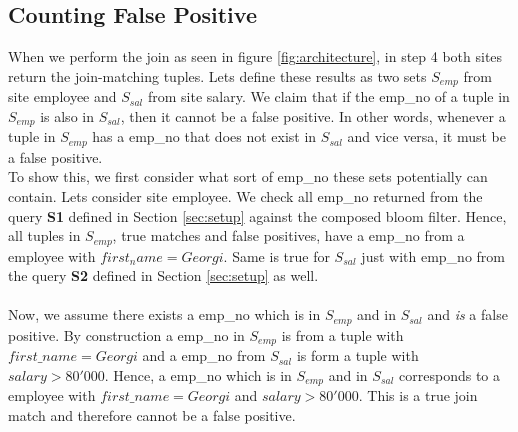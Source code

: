 \documentclass[12]{scrartcl}
\begin{document}
\subsection{Counting False Positive} \label{sec:falsepositives}
When we perform the join as seen in figure \ref{fig:architecture}, in step 4 both sites return the join-matching tuples. Lets define these results as two sets $S_{emp}$ from site employee and $S_{sal}$ from site salary. We claim that if the emp\_no of a tuple in $S_{emp}$ is also in $S_{sal}$, then it cannot be a false positive. In other words, whenever a tuple in $S_{emp}$ has a emp\_no that does not exist in $S_{sal}$ and vice versa, it must be a false positive. \\
To show this, we first consider what sort of emp\_no these sets potentially can contain. Lets consider site employee. We check all emp\_no returned from the query \textbf{S1} defined in Section \ref{sec:setup} against the composed bloom filter. Hence, all tuples in $S_{emp}$, true matches and false positives, have a emp\_no from a employee with $first_name = Georgi$. Same is true for $S_{sal}$ just with emp\_no from the query \textbf{S2} defined in Section \ref{sec:setup} as well.\\\\
Now, we assume there exists a emp\_no which is in $S_{emp}$ and in $S_{sal}$ and \emph{is} a false positive. By construction a emp\_no in $S_{emp}$ is from a tuple with $first\_name = Georgi$ and a emp\_no from $S_{sal}$ is form a tuple with $salary > 80'000$. Hence, a emp\_no which is in $S_{emp}$ and in $S_{sal}$ corresponds to a employee with $first\_name = Georgi$ and $salary > 80'000$. This is a true join match and therefore cannot be a false positive.
\end{document}
